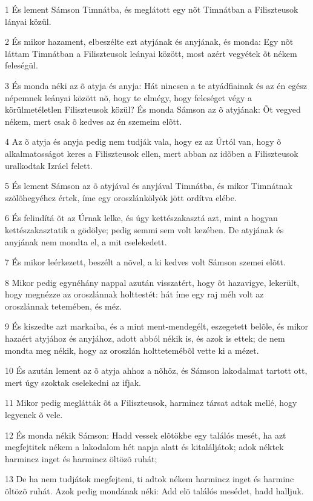 \par 1 És lement Sámson Timnátba, és meglátott egy nõt Timnátban a Filiszteusok lányai közül.
\par 2 És mikor hazament, elbeszélte ezt atyjának és anyjának, és monda: Egy nõt láttam Timnátban a Filiszteusok leányai között, most azért vegyétek õt nékem feleségül.
\par 3 És monda néki az õ atyja és anyja: Hát nincsen a te atyádfiainak és az én egész népemnek leányai között nõ, hogy te elmégy, hogy feleséget végy a körülmetéletlen Filiszteusok közül? És monda Sámson az õ atyjának: Õt vegyed nékem, mert csak õ kedves az én szemeim elõtt.
\par 4 Az õ atyja és anyja pedig nem tudják vala, hogy ez az Úrtól van, hogy õ alkalmatosságot keres a Filiszteusok ellen, mert abban az idõben a Filiszteusok uralkodtak Izráel felett.
\par 5 És lement Sámson az õ atyjával és anyjával Timnátba, és mikor Timnátnak szõlõhegyéhez értek, íme egy oroszlánkölyök jött ordítva elébe.
\par 6 És felindítá õt az Úrnak lelke, és úgy kettészakasztá azt, mint a hogyan kettészakasztatik a gödölye; pedig semmi sem volt kezében. De atyjának és anyjának nem mondta el, a mit cselekedett.
\par 7 És mikor leérkezett, beszélt a nõvel, a ki kedves volt Sámson szemei elõtt.
\par 8 Mikor pedig egynéhány nappal azután visszatért, hogy õt hazavigye, lekerült, hogy megnézze az oroszlánnak holttestét: hát íme egy raj méh volt az oroszlánnak tetemében, és méz.
\par 9 És kiszedte azt markaiba, és a mint ment-mendegélt, eszegetett belõle, és mikor hazaért atyjához és anyjához, adott abból nékik is, és azok is ettek; de nem mondta meg nékik, hogy az oroszlán holttetemébõl vette ki a mézet.
\par 10 És azután lement az õ atyja ahhoz a nõhöz, és Sámson lakodalmat tartott ott, mert úgy szoktak cselekedni az ifjak.
\par 11 Mikor pedig meglátták õt a Filiszteusok, harmincz társat adtak mellé, hogy legyenek õ vele.
\par 12 És monda nékik Sámson: Hadd vessek elõtökbe egy találós mesét, ha azt megfejtitek nékem a lakodalom hét napja alatt és kitaláljátok; adok néktek harmincz inget és harmincz öltözõ ruhát;
\par 13 De ha nem tudjátok megfejteni, ti adtok nékem harmincz inget és harminc öltözõ ruhát. Azok pedig mondának néki: Add elõ találós mesédet, hadd halljuk.
